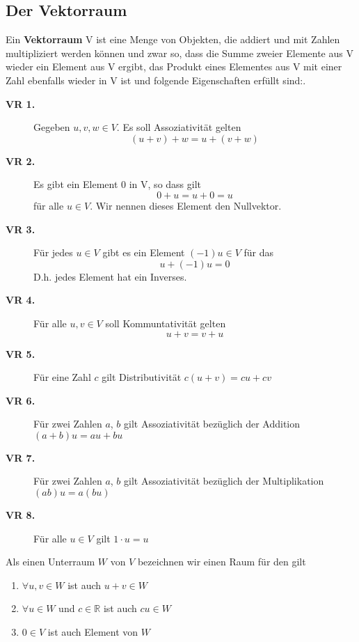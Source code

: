 \subsection{Der Vektorraum}
Ein {\bf Vektorraum} V ist eine Menge von Objekten, die addiert und mit Zahlen
multipliziert werden können und zwar so, dass die Summe zweier Elemente aus V
wieder ein Element aus V ergibt, das Produkt eines Elementes aus V mit einer Zahl
ebenfalls wieder in V ist und folgende Eigenschaften erfüllt sind:.
\begin{description}
  \item[{\bf VR 1.}] Gegeben $u,v,w\in V$. Es soll Assoziativität gelten
    \[ (u+v)+w = u+(v+w) \] 
  \item[{\bf VR 2.}] Es gibt ein Element 0 in V, so dass gilt
    \[ 0+u = u+0 =u \]
    für alle $u\in V$. Wir nennen dieses Element den Nullvektor.
  \item[{\bf VR 3.}] Für jedes $u\in V$ gibt es ein Element $(-1)u\in V$ für das 
  \[ u+(-1)u=0 \]
    D.h. jedes Element hat ein Inverses.
  \item[{\bf VR 4.}] Für alle $u,v\in V$ soll Kommuntativität gelten
    \[ u+v = v+u \]
  \item[{\bf VR 5.}] Für eine Zahl $c$ gilt Distributivität $c(u+v)=cu+cv$ 
  \item[{\bf VR 6.}] Für zwei Zahlen $a$, $b$ gilt Assoziativität bezüglich der Addition $(a+b)u=au+bu$
  \item[{\bf VR 7.}] Für zwei Zahlen $a$, $b$ gilt Assoziativität bezüglich der Multiplikation $(ab)u=a(bu)$
  \item[{\bf VR 8.}] Für alle $u\in V$ gilt $1\cdot u=u$
\end{description}
Als einen Unterraum $W$ von $V$ bezeichnen wir einen Raum für den gilt
\begin{enumerate}
  \item $\forall u,v\in W$ ist auch $u+v\in W$
  \item $\forall u\in W$ und $c\in\mathbb{R}$ ist auch $cu\in W$
  \item $0\in V$ ist auch Element von $W$ 
\end{enumerate}
